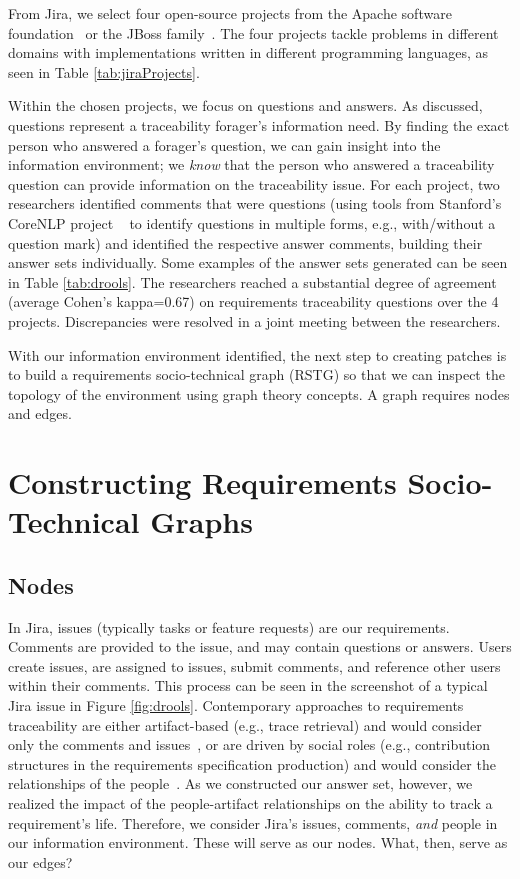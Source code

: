 From Jira, we select four open-source projects from the Apache software foundation~\cite{ICSE7} or the JBoss family~\cite{ICSE38}.
The four projects tackle problems in different domains with implementations written in different programming languages, as seen in Table \ref{tab:jiraProjects}.

Within the chosen projects, we focus on questions and answers. As discussed, questions represent a traceability forager's information need. By finding the exact person who answered a forager's question, we can gain insight into the information environment; we \textit{know} that the person who answered a traceability question can provide information on the traceability issue. For each project, two researchers identified comments that were questions (using tools from Stanford's CoreNLP project ~\cite{corenlp} to identify questions in multiple forms, e.g., with/without a question mark) and identified the respective answer comments, building their answer sets individually. Some examples of the answer sets generated can be seen in Table \ref{tab:drools}. The researchers reached a substantial degree of agreement (average Cohen's kappa=0.67) on requirements traceability questions over the 4 projects. Discrepancies were resolved in a joint meeting between the researchers. 

With our information environment identified, the next step to creating patches is to build a requirements socio-technical graph (RSTG) so that we can inspect the topology of the environment using graph theory concepts. A graph requires nodes and edges.

\section{Constructing Requirements Socio-Technical Graphs}
\subsection{Nodes}
In Jira, issues (typically tasks or feature requests) are our requirements. Comments are provided to the issue, and may contain questions or answers. Users create issues, are assigned to issues, submit comments, and reference other users within their comments. This process can be seen in the screenshot of a typical Jira issue in Figure \ref{fig:drools}. Contemporary approaches to requirements traceability are either artifact-based (e.g., trace retrieval) and would consider only the comments and issues~\cite{ICSE15}, or are driven by social roles (e.g., contribution structures in the requirements specification production) and would consider the relationships of the people~\cite{ICSE29}. As we constructed our answer set, however, we realized the impact of the people-artifact relationships on the ability to track a requirement's life. Therefore, we consider Jira's issues, comments, \textit{and} people in our information environment. These will serve as our nodes. What, then, serve as our edges?

